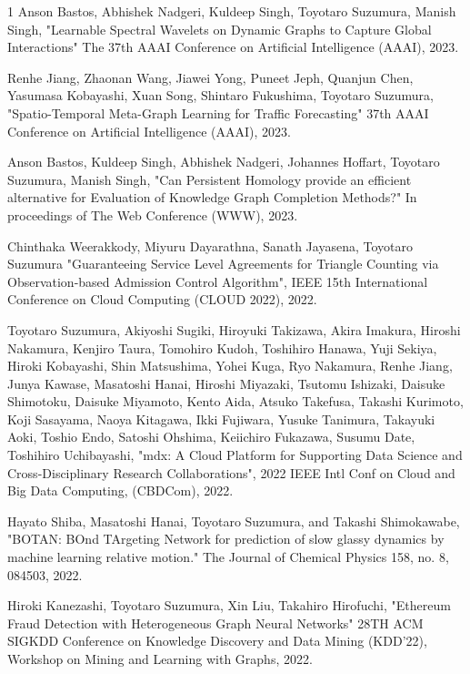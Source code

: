 \begin{査読付}{1}
Anson Bastos, Abhishek Nadgeri, Kuldeep Singh, Toyotaro Suzumura, Manish Singh,
"Learnable Spectral Wavelets on Dynamic Graphs to Capture Global Interactions"
The 37th AAAI Conference on Artificial Intelligence (AAAI), 2023.

Renhe Jiang, Zhaonan Wang, Jiawei Yong, Puneet Jeph, Quanjun Chen, Yasumasa Kobayashi, Xuan Song, Shintaro Fukushima, Toyotaro Suzumura,
"Spatio-Temporal Meta-Graph Learning for Traffic Forecasting"
37th AAAI Conference on Artificial Intelligence (AAAI), 2023.

Anson Bastos, Kuldeep Singh, Abhishek Nadgeri, Johannes Hoffart, Toyotaro Suzumura, Manish Singh,
"Can Persistent Homology provide an efficient alternative for Evaluation of Knowledge Graph Completion Methods?"
In proceedings of The Web Conference (WWW), 2023.


Chinthaka Weerakkody, Miyuru Dayarathna, Sanath Jayasena, Toyotaro Suzumura
"Guaranteeing Service Level Agreements for Triangle Counting via Observation-based Admission Control Algorithm", IEEE 15th International Conference on Cloud Computing (CLOUD 2022), 2022.

Toyotaro Suzumura, Akiyoshi Sugiki, Hiroyuki Takizawa, Akira Imakura, Hiroshi Nakamura, Kenjiro Taura, Tomohiro Kudoh, Toshihiro Hanawa, Yuji Sekiya, Hiroki Kobayashi, Shin Matsushima, Yohei Kuga, Ryo Nakamura, Renhe Jiang, Junya Kawase, Masatoshi Hanai, Hiroshi Miyazaki, Tsutomu Ishizaki, Daisuke Shimotoku, Daisuke Miyamoto, Kento Aida, Atsuko Takefusa, Takashi Kurimoto, Koji Sasayama, Naoya Kitagawa, Ikki Fujiwara, Yusuke Tanimura, Takayuki Aoki, Toshio Endo, Satoshi Ohshima, Keiichiro Fukazawa, Susumu Date, Toshihiro Uchibayashi,
"mdx: A Cloud Platform for Supporting Data Science and Cross-Disciplinary Research Collaborations", 2022 IEEE Intl Conf on Cloud and Big Data Computing, (CBDCom), 2022.

Hayato Shiba, Masatoshi Hanai, Toyotaro Suzumura, and Takashi Shimokawabe, "BOTAN: BOnd TArgeting Network for prediction of slow glassy dynamics by machine learning relative motion." The Journal of Chemical Physics 158, no. 8, 084503, 2022.

Hiroki Kanezashi, Toyotaro Suzumura, Xin Liu, Takahiro Hirofuchi,
"Ethereum Fraud Detection with Heterogeneous Graph Neural Networks"
28TH ACM SIGKDD Conference on Knowledge Discovery and Data Mining (KDD'22), Workshop on Mining and Learning with Graphs, 2022.


\end{査読付}
